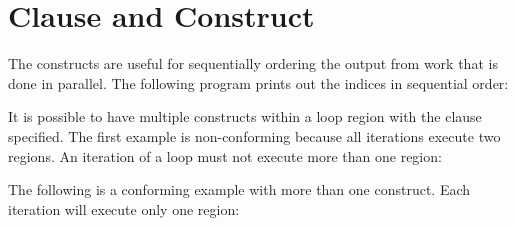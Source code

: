 \section{ Clause and  Construct}
\label{sec:ordered}

The  constructs  are useful for sequentially ordering the output from work that
is done in parallel. The following program prints out the indices in sequential 
order:



It is possible to have multiple  constructs within a loop region 
with the  clause specified. The first example is non-conforming 
because all iterations execute two  regions. An iteration of a 
loop must not execute more than one  region:



The following is a conforming example with more than one  construct. 
Each iteration will execute only one  region:



